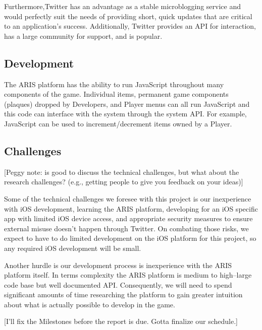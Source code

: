 \documentclass{sigchi}
\begin{document}
Furthermore,Twitter has an advantage as a stable microblogging service and would perfectly suit the needs of providing short, quick updates that are critical to an application’s success. Additionally, Twitter provides an API for interaction, has a large community for support, and is popular.

\subsection{Development}
The ARIS platform has the ability to run JavaScript throughout many components of the game. Individual items, permanent game components (plaques) dropped by Developers, and Player menus can all run JavaScript and this code can interface with the system through the system API. For example, JavaScript can be used to increment/decrement items owned by a Player. 

\subsection{Challenges}
[Peggy note: is good to discuss the technical challenges, but what about the research challenges?  (e.g., getting people to give you feedback on your ideas)]

Some of the technical challenges we foresee with this project is our inexperience with iOS development, learning the ARIS platform, developing for an iOS specific app with limited iOS device access, and appropriate security measures to ensure external misuse doesn't happen through Twitter. On combating those risks, we expect to have to do limited development on the iOS platform for this project, so any required iOS development will be small. 

Another hurdle is our development process is inexperience with the ARIS platform itself. In terms complexity the ARIS platform is medium to high--large code base but well documented API. Consequently, we will need to spend significant amounts of time researching the platform to gain greater intuition about what is actually possible to develop in the game.

[I'll fix the Milestones before the report is due. Gotta finalize our schedule.]
\end{document}
